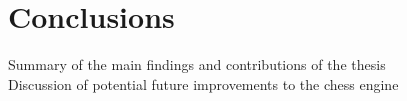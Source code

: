 \chapter{Conclusions}
\label{conclusions}

Summary of the main findings and contributions of the thesis\\
Discussion of potential future improvements to the chess engine
